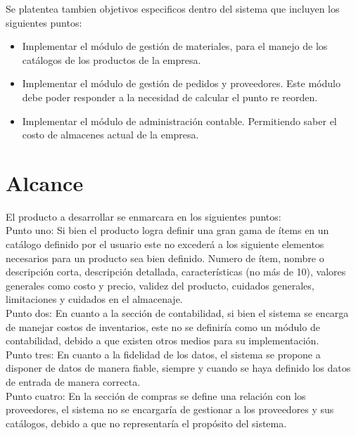 Se platentea tambien objetivos especificos dentro del sistema que incluyen los siguientes puntos:

\begin{itemize}
\item Implementar el módulo de gestión de materiales, para el manejo de los catálogos de los productos de la empresa.
\item Implementar el módulo de gestión de pedidos y proveedores. Este módulo debe poder responder a la necesidad de calcular el punto re reorden.
\item Implementar el módulo de administración contable. Permitiendo saber el costo de almacenes actual de la empresa.
\end{itemize}


\section{Alcance}

El producto a desarrollar se enmarcara en los siguientes puntos:\\

Punto uno: Si bien el producto logra definir una gran gama de ítems en un catálogo definido por el usuario este no excederá a los siguiente elementos necesarios para un producto sea bien definido. Numero de ítem, nombre o descripción corta, descripción detallada, características (no más de 10), valores generales como costo y precio, validez del producto, cuidados generales, limitaciones y cuidados en el almacenaje.\\

Punto dos: En cuanto a la sección de contabilidad, si bien el sistema se encarga de manejar costos de inventarios, este no se definiría como un módulo de contabilidad, debido a que existen otros medios para su implementación.\\

Punto tres: En cuanto a la fidelidad de los datos, el sistema se propone a disponer de datos de manera fiable, siempre y cuando se haya definido los datos de entrada de manera correcta.\\

Punto cuatro: En la sección de compras se define una relación con los proveedores, el sistema no se encargaría de gestionar a los proveedores y sus catálogos, debido a que no representaría el propósito del sistema.\\

